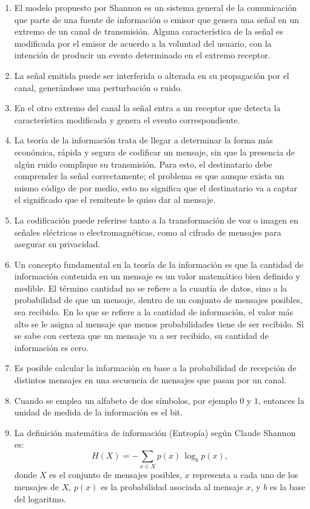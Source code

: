 \documentclass[11pt,a4paper,openany]{book}
\begin{document}
\begin{enumerate}
	\item El modelo propuesto por Shannon es un sistema general de la comunicación que parte de una fuente de información o emisor que genera una señal en un extremo de un canal de transmisión. Alguna característica de la señal es modificada por el emisor de acuerdo a la voluntad del usuario, con la intención de producir un evento determinado en el extremo receptor.
	\item La señal emitida puede ser interferida o alterada en su propagación por el canal, generándose una perturbación o ruido.
	\item En el otro extremo del canal la señal entra a un receptor que detecta la característica modificada y genera el evento correspondiente.
	\item La teoría de la información trata de llegar a determinar la forma más económica, rápida y segura de codificar un mensaje, sin que la presencia de algún ruido complique su transmisión. Para esto, el destinatario debe comprender la señal correctamente; el problema es que aunque exista un mismo código de por medio, esto no significa que el destinatario va a captar el significado que el remitente le quiso dar al mensaje.
	\item La codificación puede referirse tanto a la transformación de voz o imagen en señales eléctricas o electromagnéticas, como al cifrado de mensajes para asegurar su privacidad.
	\item Un concepto fundamental en la teoría de la información es que la cantidad de información contenida en un mensaje es un valor matemático bien definido y medible. El término cantidad no se refiere a la cuantía de datos, sino a la probabilidad de que un mensaje, dentro de un conjunto de mensajes posibles, sea recibido. En lo que se refiere a la cantidad de información, el valor más alto se le asigna al mensaje que menos probabilidades tiene de ser recibido. Si se sabe con certeza que un mensaje va a ser recibido, su cantidad de información es cero.
	\item Es posible calcular la información en base a la probabilidad de recepción de distintos mensajes en una secuencia de mensajes que pasan por un canal.
	\item Cuando se emplea un alfabeto de dos símbolos, por ejemplo $0$ y $1$, entonces la unidad de medida de la información es el bit.
	\item La definición matemática de información (Entropía) según Claude Shannon es:
	\begin{equation}
		H(X) = - \sum_{x \in X} p(x) \, \log_{b} p(x),
	\end{equation}
	donde $X$ es el conjunto de mensajes posibles, $x$ representa a cada uno de los mensajes de $X$, $p(x)$ es la probabilidad asociada al mensaje $x$, y $b$ es la base del logaritmo.
	

\end{enumerate}
\end{document}
